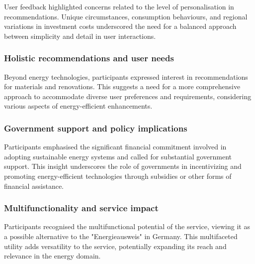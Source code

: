 User feedback highlighted concerns related to the level of personalisation in recommendations. 
Unique circumstances, consumption behaviours, and regional variations in investment costs underscored the need for a balanced approach between simplicity and detail in user interactions.


\subsubsection*{Holistic recommendations and user needs}

Beyond energy technologies, participants expressed interest in recommendations for materials and renovations. 
This suggests a need for a more comprehensive approach to accommodate diverse user preferences and requirements, considering various aspects of energy-efficient enhancements.


\subsubsection*{Government support and policy implications}

Participants emphasised the significant financial commitment involved in adopting sustainable energy systems and called for substantial government support. 
This insight underscores the role of governments in incentivizing and promoting energy-efficient technologies through subsidies or other forms of financial assistance.


\subsubsection*{Multifunctionality and service impact}

Participants recognised the multifunctional potential of the service, viewing it as a possible alternative to the "Energieausweis" in Germany. 
This multifaceted utility adds versatility to the service, potentially expanding its reach and relevance in the energy domain. 


